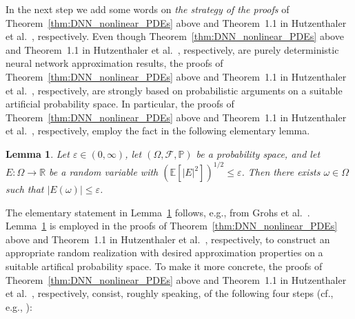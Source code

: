 \documentclass[12pt]{article}
\newtheorem{lemma}{Lemma}
\theoremstyle{definition}
\newcommand{\R}{\mathbb{R}}
\renewcommand{\P}{\mathbb{P}}
\newcommand{\E}{\mathbb{E}}
\begin{document}
In the next step we add some words on 
\emph{the strategy 
of the proofs} of 
Theorem~\ref{thm:DNN_nonlinear_PDEs} above 
and 
Theorem~1.1 in Hutzenthaler et al.~\cite{hutzenthaler2020proof}, 
respectively. Even though 
Theorem~\ref{thm:DNN_nonlinear_PDEs} above
and 
Theorem~1.1 in Hutzenthaler et al.~\cite{hutzenthaler2020proof}, respectively, 
are purely deterministic neural network 
approximation results, 
the proofs of 
Theorem~\ref{thm:DNN_nonlinear_PDEs} above 
and 
Theorem~1.1 in Hutzenthaler et al.~\cite{hutzenthaler2020proof}, 
respectively, are strongly based on 
probabilistic arguments on a suitable 
artificial probability space. 
In particular, the proofs of 
Theorem~\ref{thm:DNN_nonlinear_PDEs} above 
and 
Theorem~1.1 in Hutzenthaler et al.~\cite{hutzenthaler2020proof}, 
respectively, 
employ the fact in the following elementary lemma. 
%
%
\begin{lemma}
\label{lem:elementary}
Let $ \varepsilon \in (0,\infty) $, 
let $ ( \Omega, \mathcal{F}, \P ) $ be a probability space, 
and 
let $ E \colon \Omega \to \R $ be a random variable 
with $ ( \E[ | E |^2 ] )^{ 1 / 2  } \leq \varepsilon $. 
Then there exists $ \omega \in \Omega $ such that 
$ | E( \omega ) | \leq \varepsilon $.
\end{lemma}
%
%
The elementary statement in Lemma~\ref{lem:elementary} follows, e.g., 
from Grohs et al.~\cite[Proposition~3.3]{grohs2018proof}.
%
Lemma~\ref{lem:elementary} is employed in the proofs of 
Theorem~\ref{thm:DNN_nonlinear_PDEs} above 
and 
Theorem~1.1 in Hutzenthaler et al.~\cite{hutzenthaler2020proof}, 
respectively, 
to construct an appropriate random realization 
with desired approximation properties 
on a suitable artifical probability space. 
%
To make it more concrete, 
the proofs of 
Theorem~\ref{thm:DNN_nonlinear_PDEs} above 
and 
Theorem~1.1 in Hutzenthaler et al.~\cite{hutzenthaler2020proof}, respectively,  
consist, roughly speaking, of the following 
four steps (cf., e.g., \cite[Section~1]{jentzen2018proofarxiv1809}):
\end{document}
